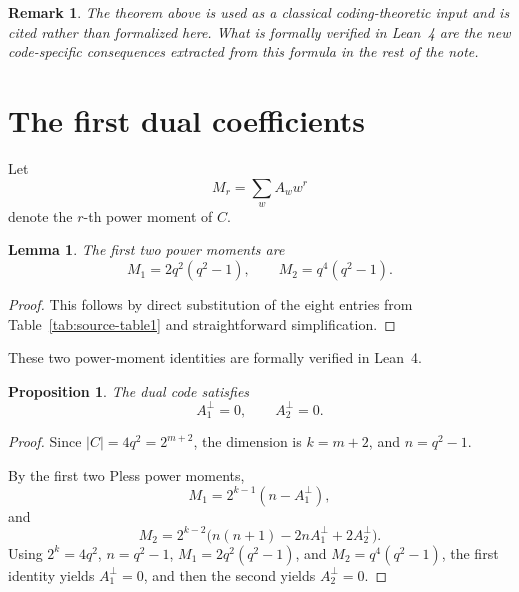 \documentclass[11pt]{article}
\newtheorem{proposition}[theorem]{Proposition}
\newtheorem{lemma}[theorem]{Lemma}
\newtheorem{remark}[theorem]{Remark}
\begin{document}
\begin{remark}
The theorem above is used as a classical coding-theoretic input and is cited rather than formalized here. What is formally verified in Lean~4 are the new code-specific consequences extracted from this formula in the rest of the note.
\end{remark}

\section{The first dual coefficients}

Let
\begin{equation}
M_r=\sum_w A_w w^r
\end{equation}
denote the $r$-th power moment of $C$.

\begin{lemma}
The first two power moments are
\begin{equation}
M_1=2q^2(q^2-1),
\qquad
M_2=q^4(q^2-1).
\end{equation}
\end{lemma}

\begin{proof}
This follows by direct substitution of the eight entries from Table~\ref{tab:source-table1} and straightforward simplification.
\end{proof}

These two power-moment identities are formally verified in Lean~4.

\begin{proposition}
The dual code satisfies
\begin{equation}
A_1^{\perp}=0,
\qquad
A_2^{\perp}=0.
\end{equation}
\end{proposition}

\begin{proof}
Since $|C|=4q^2=2^{m+2}$, the dimension is $k=m+2$, and $n=q^2-1$.

By the first two Pless power moments,
\begin{equation}
M_1=2^{k-1}(n-A_1^{\perp}),
\end{equation}
and
\begin{equation}
M_2=2^{k-2}\bigl(n(n+1)-2nA_1^{\perp}+2A_2^{\perp}\bigr).
\end{equation}
Using $2^k=4q^2$, $n=q^2-1$, $M_1=2q^2(q^2-1)$, and $M_2=q^4(q^2-1)$, the first identity yields $A_1^{\perp}=0$, and then the second yields $A_2^{\perp}=0$.
\end{proof}
\end{document}
